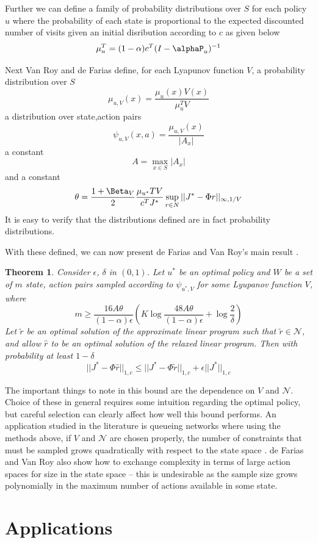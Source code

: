 \documentclass[12pt,reqno]{amsart}
\newtheorem{thm}{Theorem}[section]
\newcommand{\sN}{\mathcal{N}}
\numberwithin{equation}{section}
\begin{document}
Further we can define a family of probability distributions over $S$ for each policy $u$ where the probability of each state is proportional to the expected discounted number of visits given an initial disribution according to $c$ as given below
$$
\mu_u^T = (1-\alpha)c^T(I - \alphaP_u)^{-1}
$$

Next Van Roy and de Farias define, for each Lyapunov function $V$, a probability distribution over $S$
$$
\mu_{u,V}(x) = \frac{\mu_u(x)V(x)}{\mu_u^TV}
$$
a distribution over state,action pairs
$$
\psi_{u,V}(x,a) = \frac{\mu_{u,V}(x)}{|A_x|}
$$
a constant
$$A = \max_{x \in S} |A_x|$$
and a constant
$$\theta = \frac{1 + \Beta_V}{2} \frac{\mu_{u^*}T V} { c^T J^*} \sup_{r \in N} ||J^* - \Phi r||_{\infty, 1/V}$$
It is easy to verify that the distributions defined are in fact probability distributions.

With these defined, we can now present de Farias and Van Roy's main result \cite{FV2}.

\begin{thm}
Consider $\epsilon$, $\delta$ in $(0,1)$. Let $u^*$ be an optimal policy and $W$ be a set of $m$ state, action pairs sampled according to $\psi_{u^*,V}$ for some Lyupanov function $V$, where
$$
m \geq \frac{16A\theta}{(1-\alpha)\epsilon} (K \log \frac{48 A\theta}{(1-\alpha)\epsilon} + \log \frac{2}{\delta})
$$
Let $\tilde{r}$ be an optimal solution of the approximate linear program such that $\tilde{r} \in \sN$, and allow $\hat{r}$ to be an optimal solution of the relaxed linear program. Then with probability at least $1-\delta$
$$
||J^* - \Phi \hat{r} ||_{1,c} \leq ||J^* - \Phi \tilde{r} ||_{1,c} + \epsilon ||J^*||_{1,c}
$$
\end{thm}

The important things to note in this bound are the dependence on $V$ and $\sN$. Choice of these in general requires some intuition regarding the optimal policy, but careful selection can clearly affect how well this bound performs. An application studied in the literature is queueing networks where using the methods above, if $V$ and $\sN$ are chosen properly, the number of constraints that must be sampled grows quadratically with respect to the state space \cite{FV2}. de Farias and Van Roy also show how to exchange complexity in terms of large action spaces for size in the state space -- this is undesirable as the sample size grows polynomially in the maximum number of actions available in some state.


\section{Applications}
\end{document}
